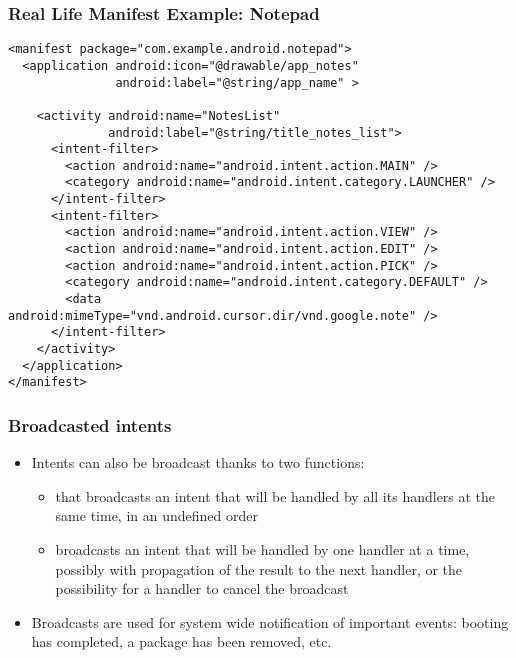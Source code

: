 \begin{frame}[fragile]
  \frametitle{Real Life Manifest Example: Notepad}
\begin{verbatim}
<manifest package="com.example.android.notepad">
  <application android:icon="@drawable/app_notes"
               android:label="@string/app_name" >

    <activity android:name="NotesList"
              android:label="@string/title_notes_list">
      <intent-filter>
        <action android:name="android.intent.action.MAIN" />
        <category android:name="android.intent.category.LAUNCHER" />
      </intent-filter>
      <intent-filter>
        <action android:name="android.intent.action.VIEW" />
        <action android:name="android.intent.action.EDIT" />
        <action android:name="android.intent.action.PICK" />
        <category android:name="android.intent.category.DEFAULT" />
        <data android:mimeType="vnd.android.cursor.dir/vnd.google.note" />
      </intent-filter>
    </activity>
  </application>
</manifest>
\end{verbatim}
\end{frame}

\begin{frame}
  \frametitle{Broadcasted intents}
  \begin{itemize}
  \item Intents can also be broadcast thanks to two functions:
    \begin{itemize}
    \item {} that broadcasts an intent that will be
      handled by all its handlers at the same time, in an undefined order
    \item {} broadcasts an intent that will
      be handled by one handler at a time, possibly with propagation
      of the result to the next handler, or the possibility for a
      handler to cancel the broadcast
    \end{itemize}
  \item Broadcasts are used for system wide notification of important
    events: booting has completed, a package has been removed,
    etc.
  \end{itemize}
\end{frame}

